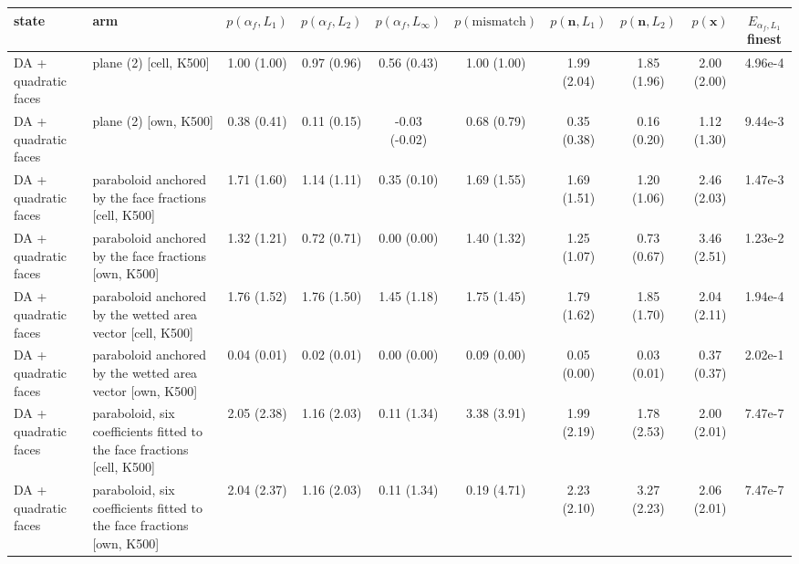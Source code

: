 \begin{tabular}{llcccccccc}
\toprule
state & arm & $p(\alpha_f, L_1)$ & $p(\alpha_f, L_2)$ & $p(\alpha_f, L_\infty)$ & $p(\text{mismatch})$ & $p(\mathbf{n}, L_1)$ & $p(\mathbf{n}, L_2)$ & $p(\mathbf{x})$ & $E_{\alpha_f, L_1}$ finest \\
\midrule
DA + quadratic faces & plane (2) [cell, K500] & 1.00 (1.00) & 0.97 (0.96) & 0.56 (0.43) & 1.00 (1.00) & 1.99 (2.04) & 1.85 (1.96) & 2.00 (2.00) & 4.96e-4 \\
DA + quadratic faces & plane (2) [own, K500] & 0.38 (0.41) & 0.11 (0.15) & -0.03 (-0.02) & 0.68 (0.79) & 0.35 (0.38) & 0.16 (0.20) & 1.12 (1.30) & 9.44e-3 \\
DA + quadratic faces & paraboloid anchored by the face fractions [cell, K500] & 1.71 (1.60) & 1.14 (1.11) & 0.35 (0.10) & 1.69 (1.55) & 1.69 (1.51) & 1.20 (1.06) & 2.46 (2.03) & 1.47e-3 \\
DA + quadratic faces & paraboloid anchored by the face fractions [own, K500] & 1.32 (1.21) & 0.72 (0.71) & 0.00 (0.00) & 1.40 (1.32) & 1.25 (1.07) & 0.73 (0.67) & 3.46 (2.51) & 1.23e-2 \\
DA + quadratic faces & paraboloid anchored by the wetted area vector [cell, K500] & 1.76 (1.52) & 1.76 (1.50) & 1.45 (1.18) & 1.75 (1.45) & 1.79 (1.62) & 1.85 (1.70) & 2.04 (2.11) & 1.94e-4 \\
DA + quadratic faces & paraboloid anchored by the wetted area vector [own, K500] & 0.04 (0.01) & 0.02 (0.01) & 0.00 (0.00) & 0.09 (0.00) & 0.05 (0.00) & 0.03 (0.01) & 0.37 (0.37) & 2.02e-1 \\
DA + quadratic faces & paraboloid, six coefficients fitted to the face fractions [cell, K500] & 2.05 (2.38) & 1.16 (2.03) & 0.11 (1.34) & 3.38 (3.91) & 1.99 (2.19) & 1.78 (2.53) & 2.00 (2.01) & 7.47e-7 \\
DA + quadratic faces & paraboloid, six coefficients fitted to the face fractions [own, K500] & 2.04 (2.37) & 1.16 (2.03) & 0.11 (1.34) & 0.19 (4.71) & 2.23 (2.10) & 3.27 (2.23) & 2.06 (2.01) & 7.47e-7 \\
\bottomrule
\end{tabular}
